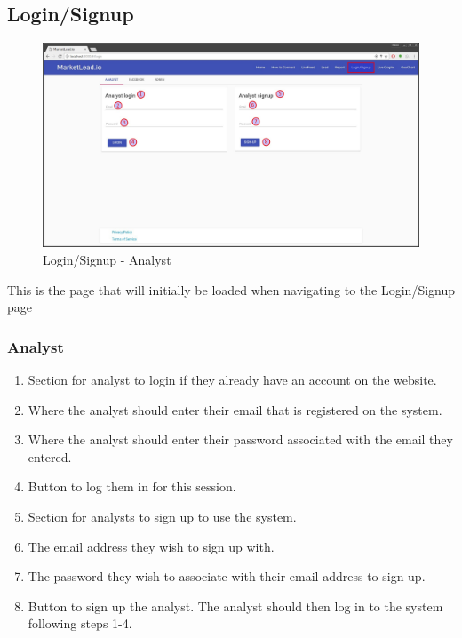 \documentclass{article}
\begin{document}
		\subsection{Login/Signup}
			\begin{figure}[H]
				\includegraphics[width=\textwidth]{images/login_signup.jpg}
				\caption{Login/Signup - Analyst}
				\label{fig:loginSignupAnalyst}
			\end{figure}
			This is the page that will initially be loaded when navigating to the Login/Signup page
			
			\subsubsection{Analyst}
				\begin{enumerate}
					\item Section for analyst to login if they already have an account on the website.
					\item Where the analyst should enter their email that is registered on the system.
					\item Where the analyst should enter their password associated with the email they entered.
					\item Button to log them in for this session.
					\item Section for analysts to sign up to use the system.
					\item The email address they wish to sign up with.
					\item The password they wish to associate with their email address to sign up.
					\item Button to sign up the analyst. The analyst should then log in to the system following steps 1-4.
				\end{enumerate}
\end{document}
